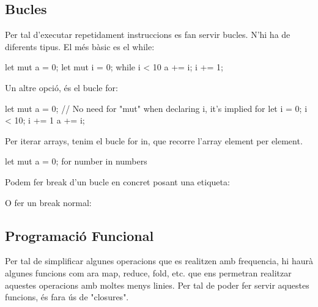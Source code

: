 ﻿\documentclass{article}
\begin{document}
\subsection{Bucles}

Per tal d'executar repetidament instruccions es fan servir bucles. N'hi ha de 
diferents tipus. El més bàsic es el while:

\begin{code}
let mut a = 0;
let mut i = 0;
while i < 10 {
    a += i;
    i += 1;
}
\end{code}

Un altre opció, és el bucle for:

\begin{code}
let mut a = 0;
// No need for "mut" when declaring i, it's implied
for let i = 0; i < 10; i += 1 {
    a += i;
}
\end{code}

Per iterar arrays, tenim el bucle for in, que recorre l'array element per element.

\begin{code}
let mut a = 0;
for number in numbers {

}
\end{code}


Podem fer break d'un bucle en concret posant una etiqueta:


O fer un break normal:


\subsection{Programació Funcional}

Per tal de simplificar algunes operacions que es realitzen amb frequencia, hi 
haurà algunes funcions com ara map, reduce, fold, etc. que ens permetran 
realitzar aquestes operacions amb moltes menys linies. Per tal de poder fer servir
aquestes funcions, és fara ús de "closures".

\end{document}
